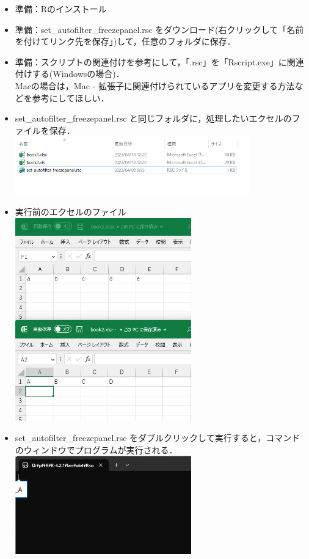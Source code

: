 \documentclass[
]{article}
\begin{document}
\begin{itemize}
\item
  準備：Rのインストール
\item
  準備：set\_autofilter\_freezepanel.rsc
  をダウンロード(右クリックして「名前を付けてリンク先を保存」)して，任意のフォルダに保存．
\item
  準備：スクリプトの関連付けを参考にして，「.rsc」を「Rscript.exe」に関連付けする(Windowsの場合)．\\
  Macの場合は，Mac - 拡張子に関連付けられているアプリを変更する方法などを参考にしてほしい．
\item
  set\_autofilter\_freezepanel.rsc と同じフォルダに，処理したいエクセルのファイルを保存．\\
  \includegraphics[width=0.8\textwidth,height=\textheight]{img/set_autofilter_freezepanel01.png}
\item
  実行前のエクセルのファイル\\
  \includegraphics[width=0.6\textwidth,height=\textheight]{img/set_autofilter_freezepanel02.png}
\item
  set\_autofilter\_freezepanel.rsc をダブルクリックして実行すると，コマンドのウィンドウでプログラムが実行される．\\
  \includegraphics[width=0.6\textwidth,height=\textheight]{img/set_autofilter_freezepanel03.png}\\

\end{itemize}
\end{document}
